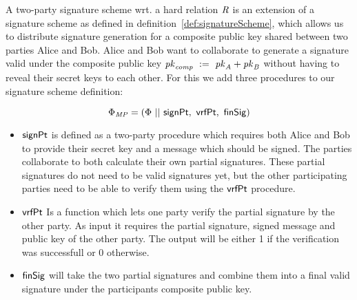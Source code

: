 \begin{definition}
    \label{def:twoPartySig}
    A two-party signature scheme wrt. a hard relation $\mathit{R}$ is an extension of a signature scheme as defined in definition~\ref{def:signatureScheme}, which allows us to distribute signature generation for a composite public key shared between two parties Alice and Bob.
    Alice and Bob want to collaborate to generate a signature valid under the composite public key $\mathit{pk}_{\mathit{comp}} ~:=~ \mathit{pk}_{\mathit{A}} + \mathit{pk}_{\mathit{B}}$ without having to reveal their secret keys to each other. For this we add three procedures to our signature scheme definition:

    \[ \Phi_{\mathit{MP}} = (\Phi ~||~ \mathsf{signPt} ,~ \mathsf{vrfPt} ,~ \mathsf{finSig}) \]
    \begin{itemize}
        \item $\mathsf{signPt}$ is defined as a two-party procedure which requires both Alice and Bob to provide their secret key and a message which should be signed. The parties collaborate to both calculate their own partial signatures. These partial signatures do not need to be valid signatures yet, but the other participating parties need to be able to verify them using the $\mathsf{vrfPt}$ procedure.
        \item $\mathsf{vrfPt}$ Is a function which lets one party verify the partial signature by the other party. As input it requires the partial signature, signed message and public key of the other party. The output will be either 1 if the verification was successfull or 0 otherwise.
        \item $\mathsf{finSig}$ will take the two partial signatures and combine them into a final valid signature under the participants composite public key.
    \end{itemize}
\end{definition}

